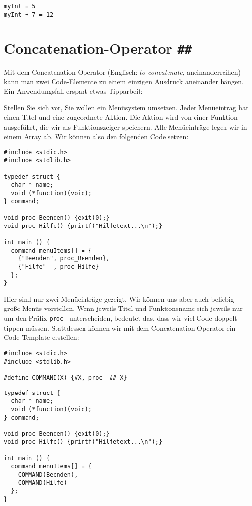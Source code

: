 \begin{cmdbox}
\begin{verbatim}
myInt = 5
myInt + 7 = 12
\end{verbatim}
\end{cmdbox}


\section{Concatenation-Operator \texttt{\#\#}}
Mit dem Concatenation-Operator (Englisch: \emph{to concatenate}, aneinanderreihen) kann man zwei Code-Elemente zu einem einzigen Ausdruck aneinander hängen. Ein Anwendungsfall erspart etwas Tipparbeit:

Stellen Sie sich vor, Sie wollen ein Menüsystem umsetzen. Jeder Menüeintrag hat einen Titel und eine zugeordnete Aktion. Die Aktion wird von einer Funktion ausgeführt, die wir als Funktionszeiger speichern. Alle Menüeinträge legen wir in einem Array ab. Wir können also den folgenden Code setzen:

\begin{codebox}
\begin{verbatim}
#include <stdio.h>
#include <stdlib.h>

typedef struct {
  char * name;
  void (*function)(void);
} command;

void proc_Beenden() {exit(0);}
void proc_Hilfe() {printf("Hilfetext...\n");}

int main () {
  command menuItems[] = {
    {"Beenden", proc_Beenden},
    {"Hilfe"  , proc_Hilfe}
  }; 
}
\end{verbatim}
\end{codebox}

Hier sind nur zwei Menüeinträge gezeigt. Wir können uns aber auch beliebig große Menüs vorstellen. Wenn jeweils Titel und Funktionsname sich jeweils nur um den Präfix \texttt{proc\_} unterscheiden, bedeutet das, dass wir viel Code doppelt tippen müssen. Stattdessen können wir mit dem Concatenation-Operator ein Code-Template erstellen:

\begin{codebox}
\begin{verbatim}
#include <stdio.h>
#include <stdlib.h>

#define COMMAND(X) {#X, proc_ ## X}
\end{verbatim}
\end{codebox}
%
\begin{codebox}[]
\begin{verbatim}
typedef struct {
  char * name;
  void (*function)(void);
} command;

void proc_Beenden() {exit(0);}
void proc_Hilfe() {printf("Hilfetext...\n");}

int main () {
  command menuItems[] = {
    COMMAND(Beenden),
    COMMAND(Hilfe)
  }; 
}
\end{verbatim}
\end{codebox}

